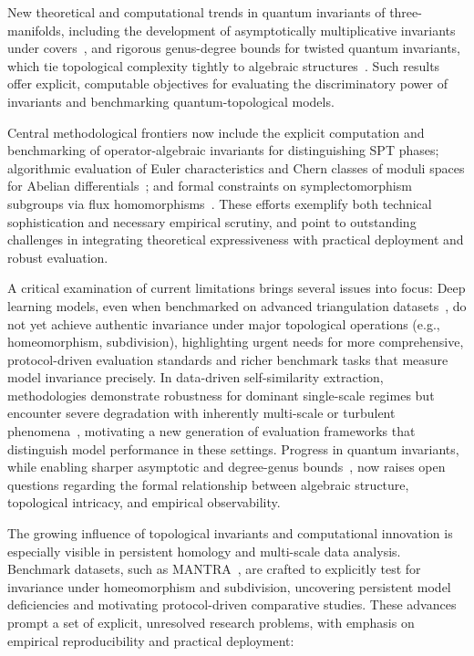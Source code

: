 \documentclass[sigconf]{acmart}
\begin{document}
New theoretical and computational trends in quantum invariants of three-manifolds, including the development of asymptotically multiplicative invariants under covers~\cite{ref89}, and rigorous genus-degree bounds for twisted quantum invariants, which tie topological complexity tightly to algebraic structures~\cite{ref90}. Such results offer explicit, computable objectives for evaluating the discriminatory power of invariants and benchmarking quantum-topological models.

Central methodological frontiers now include the explicit computation and benchmarking of operator-algebraic invariants for distinguishing SPT phases; algorithmic evaluation of Euler characteristics and Chern classes of moduli spaces for Abelian differentials~\cite{ref87}; and formal constraints on symplectomorphism subgroups via flux homomorphisms~\cite{ref86}. These efforts exemplify both technical sophistication and necessary empirical scrutiny, and point to outstanding challenges in integrating theoretical expressiveness with practical deployment and robust evaluation.

A critical examination of current limitations brings several issues into focus: Deep learning models, even when benchmarked on advanced triangulation datasets~\cite{ref26}, do not yet achieve authentic invariance under major topological operations (e.g., homeomorphism, subdivision), highlighting urgent needs for more comprehensive, protocol-driven evaluation standards and richer benchmark tasks that measure model invariance precisely. In data-driven self-similarity extraction, methodologies demonstrate robustness for dominant single-scale regimes but encounter severe degradation with inherently multi-scale or turbulent phenomena~\cite{ref65,ref30}, motivating a new generation of evaluation frameworks that distinguish model performance in these settings. Progress in quantum invariants, while enabling sharper asymptotic and degree-genus bounds~\cite{ref89,ref90}, now raises open questions regarding the formal relationship between algebraic structure, topological intricacy, and empirical observability.

The growing influence of topological invariants and computational innovation is especially visible in persistent homology and multi-scale data analysis. Benchmark datasets, such as MANTRA~\cite{ref26}, are crafted to explicitly test for invariance under homeomorphism and subdivision, uncovering persistent model deficiencies and motivating protocol-driven comparative studies. These advances prompt a set of explicit, unresolved research problems, with emphasis on empirical reproducibility and practical deployment:
\end{document}
